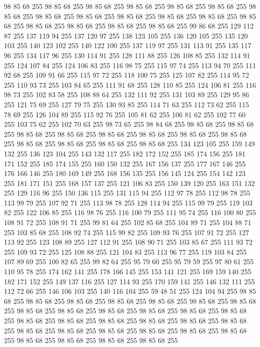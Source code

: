98 85 68 255 98 85 68 255 98 85 68 255 98 85 68 255 98 85 68 255 98 85 68 255 98 85 68 255 98 85 68 255 98 85 68 255 98 85 68 255 98 85 68 255 98 85 68 255 98 85 68 255 98 85 68 255 98 85 68 255 98 85 68 255 98 85 68 255 99 86 68 255 129 112 87 255 137 119 94 255 137 120 97 255 138 123 105 255 136 120 105 255 135 120 103 255 140 123 102 255 140 122 100 255 137 119 97 255 131 113 91 255 135 117 96 255 134 117 96 255 130 114 91 255 128 111 88 255 126 108 85 255 132 114 91 255 124 107 84 255 124 106 83 255 116 98 75 255 115 97 74 255 113 94 70 255 111 92 68 255 109 91 66 255 115 97 72 255 118 100 75 255 125 107 82 255 114 95 72 255 110 93 73 255 103 84 65 255 111 91 68 255 128 110 85 255 124 106 81 255 116 98 73 255 102 83 58 255 108 88 64 255 132 111 92 255 131 103 89 255 129 95 86 255 121 75 69 255 127 79 75 255 130 93 85 255 114 71 63 255 112 73 62 255 115 78 69 255 126 104 89 255 115 92 76 255
105 81 62 255 106 81 62 255 102 77 60 255 103 75 62 255 102 70 63 255 98 73 65 255 98 84 68 255 98 85 68 255 98 85 68 255 98 85 68 255 98 85 68 255 98 85 68 255 98 85 68 255 98 85 68 255 98 85 68 255 98 85 68 255 98 85 68 255 98 85 68 255 98 85 68 255 134 123 105 255 159 149 132 255 136 123 104 255 143 132 117 255 182 172 152 255 185 174 156 255 181 171 152 255 185 174 155 255 160 150 132 255 167 156 137 255 177 167 146 255 176 166 146 255 180 169 149 255 168 156 135 255 156 145 124 255 154 142 123 255 181 171 151 255 168 157 137 255 121 106 83 255 150 139 120 255 163 151 132 255 129 116 96 255 150 136 115 255 131 115 94 255 112 97 78 255 112 98 78 255 113 99 79 255 107 92 71 255 113 98 78 255 128 114 94 255 115 99 79 255 119 103 82 255 122 106 85 255 116 98 76 255 116 100 79 255 111 95 74 255 116 100 80 255 108 91 72 255 108 91 71 255 99 81 64 255 102 85 68 255 104 89 71 255 104 88 71 255 103 85 68 255 108 92 74 255
115 99 82 255 109 93 76 255 107 91 72 255 127 113 92 255 123 108 89 255 127 112 91 255 108 90 71 255 103 85 67 255 111 93 72 255 109 93 72 255 125 108 88 255 121 104 83 255 113 96 77 255 119 103 84 255 107 89 69 255 100 82 65 255 99 82 64 255 95 79 60 255 95 79 59 255 97 80 61 255 110 95 78 255 174 162 141 255 178 166 145 255 153 141 121 255 169 159 140 255 182 171 152 255 149 137 116 255 127 114 93 255 170 159 141 255 146 132 111 255 112 72 66 255 146 106 103 255 140 116 104 255 59 48 51 255 124 104 94 255 98 85 68 255 98 85 68 255 98 85 68 255 98 85 68 255 98 85 68 255 98 85 68 255 98 85 68 255 98 85 68 255 98 85 68 255 98 85 68 255 98 85 68 255 98 85 68 255 98 85 68 255 98 85 68 255 98 85 68 255 98 85 68 255 98 85 68 255 98 85 68 255 98 85 68 255 98 85 68 255 98 85 68 255 98 85 68 255 98 85 68 255 98 85 68 255 98 85 68 255 98 85 68 255 98 85 68 255 98 85 68 255 98 85 68 255
